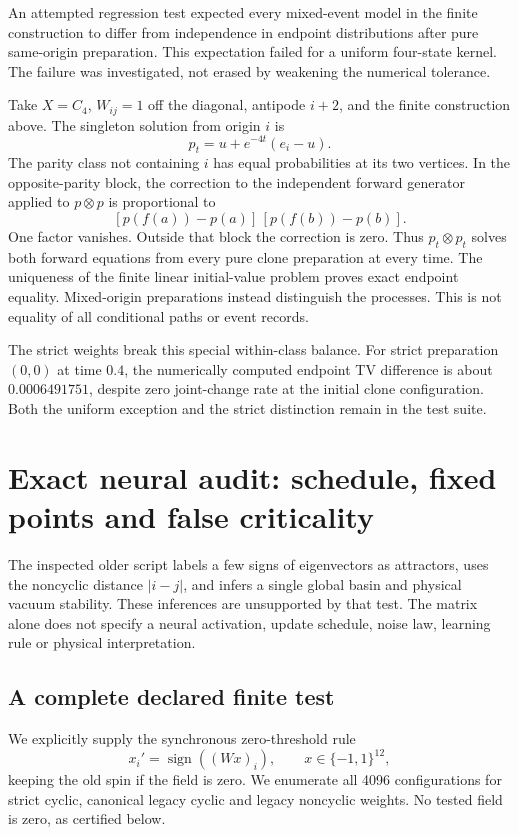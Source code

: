 \documentclass[11pt,a4paper]{article}
\begin{document}
An attempted regression test expected every mixed-event model in the
finite construction to differ from independence in endpoint distributions
after pure same-origin preparation. This expectation failed for a uniform
four-state kernel. The failure was investigated, not erased by weakening
the numerical tolerance.

Take $X=C_4$, $W_{ij}=1$ off the diagonal, antipode $i+2$, and the finite
construction above. The singleton solution from origin $i$ is
\[
 p_t=u+e^{-4t}(e_i-u).
\]
The parity class not containing $i$ has equal probabilities at its two
vertices. In the opposite-parity block, the correction to the independent
forward generator applied to $p\otimes p$ is proportional to
\[
 [p(f(a))-p(a)]\,[p(f(b))-p(b)].
\]
One factor vanishes. Outside that block the correction is zero. Thus
$p_t\otimes p_t$ solves both forward equations from every pure clone
preparation at every time. The uniqueness of the finite linear initial-value
problem proves exact endpoint equality. Mixed-origin preparations instead
distinguish the processes. This is not equality of all conditional paths or
event records.

The strict weights break this special within-class balance. For strict
preparation $(0,0)$ at time $0.4$, the numerically computed endpoint TV
difference is about $0.0006491751$, despite zero joint-change rate at the
initial clone configuration. Both the uniform exception and the strict
distinction remain in the test suite.

\section{Exact neural audit: schedule, fixed points and false criticality}

The inspected older script labels a few signs of eigenvectors as attractors,
uses the noncyclic distance $|i-j|$, and infers a single global basin and
physical vacuum stability. These inferences are unsupported by that test.
The matrix alone does not specify a neural activation, update schedule,
noise law, learning rule or physical interpretation.

\subsection{A complete declared finite test}

We explicitly supply the synchronous zero-threshold rule
\[
 x_i' =\operatorname{sign}((Wx)_i),\qquad x\in\{-1,1\}^{12},
\]
keeping the old spin if the field is zero. We enumerate all 4096
configurations for strict cyclic, canonical legacy cyclic and legacy
noncyclic weights. No tested field is zero, as certified below.
\end{document}
